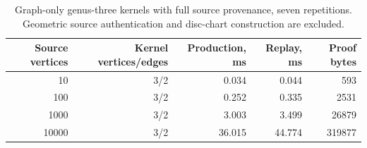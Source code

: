 \begin{table}[htbp]
\centering\small
\begin{tabular}{rrrrr}
\toprule
Source vertices & Kernel vertices/edges & Production, ms & Replay, ms & Proof bytes\\
\midrule
10 & 3/2 & 0.034 & 0.044 & 593\\
100 & 3/2 & 0.252 & 0.335 & 2531\\
1000 & 3/2 & 3.003 & 3.499 & 26879\\
10000 & 3/2 & 36.015 & 44.774 & 319877\\
\bottomrule
\end{tabular}
\caption{Graph-only genus-three kernels with full source provenance, seven repetitions. Geometric source authentication and disc-chart construction are excluded.}
\label{tab:attachment-kernel-times}
\end{table}
